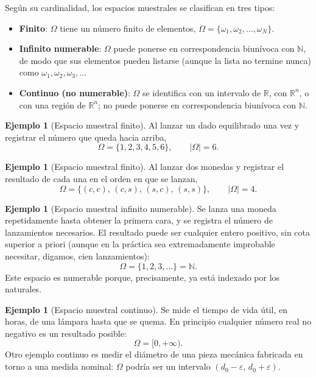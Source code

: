 \documentclass[11pt,a4paper]{article}
\theoremstyle{plain}
\theoremstyle{definition}
\newtheorem{ejemplo}[teorema]{Ejemplo}
\theoremstyle{remark}
\begin{document}
Según su cardinalidad, los espacios muestrales se clasifican en tres tipos:

\begin{itemize}[leftmargin=2em]
\item \textbf{Finito}: $\Omega$ tiene un número finito de elementos, $\Omega=\{\omega_1,\omega_2,\dots,\omega_N\}$.
\item \textbf{Infinito numerable}: $\Omega$ puede ponerse en correspondencia biunívoca con $\mathbb{N}$, de modo que sus elementos pueden listarse (aunque la lista no termine nunca) como $\omega_1,\omega_2,\omega_3,\dots$
\item \textbf{Continuo (no numerable)}: $\Omega$ se identifica con un intervalo de $\mathbb{R}$, con $\mathbb{R}^n$, o con una región de $\mathbb{R}^n$; no puede ponerse en correspondencia biunívoca con $\mathbb{N}$.
\end{itemize}

\begin{ejemplo}[Espacio muestral finito]
Al lanzar un dado equilibrado una vez y registrar el número que queda hacia arriba,
\[
\Omega = \{1,2,3,4,5,6\}, \qquad |\Omega| = 6.
\]
\end{ejemplo}

\begin{ejemplo}[Espacio muestral finito]
Al lanzar dos monedas y registrar el resultado de cada una en el orden en que se lanzan,
\[
\Omega = \{(c,c),\,(c,s),\,(s,c),\,(s,s)\}, \qquad |\Omega|=4.
\]
\end{ejemplo}

\begin{ejemplo}[Espacio muestral infinito numerable]
Se lanza una moneda repetidamente hasta obtener la primera cara, y se registra el número de lanzamientos necesarios. El resultado puede ser cualquier entero positivo, sin cota superior a priori (aunque en la práctica sea extremadamente improbable necesitar, digamos, cien lanzamientos):
\[
\Omega = \{1,2,3,\dots\} = \mathbb{N}.
\]
Este espacio es numerable porque, precisamente, ya está indexado por los naturales.
\end{ejemplo}

\begin{ejemplo}[Espacio muestral continuo]
Se mide el tiempo de vida útil, en horas, de una lámpara hasta que se quema. En principio cualquier número real no negativo es un resultado posible:
\[
\Omega = [0,+\infty).
\]
Otro ejemplo continuo es medir el diámetro de una pieza mecánica fabricada en torno a una medida nominal: $\Omega$ podría ser un intervalo $(d_0-\varepsilon,\, d_0+\varepsilon)$.
\end{ejemplo}
\end{document}
